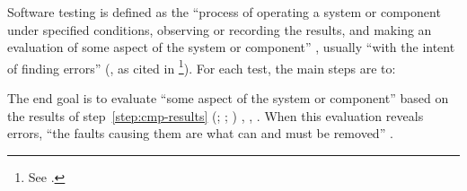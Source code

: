 Software testing is defined as the ``process of operating a system or component
under specified conditions, observing or recording the results, and making an
evaluation of some aspect of the system or component'' \citep{ISO_IEC2014}%
\ifnotpaper, usually ``with the intent of finding errors''
(\citealp{Myers1976}, as cited in \citealp[p.~438]{PetersAndPedrycz2000}%
\footnote{See .})\fi.
For each test, the main steps are to:
The end goal is to evaluate ``some aspect of the system or component'' based on
the results of step~\ref{step:cmp-results} \ifnotpaper (\citealp[p.~10]{IEEE2022};
    \citeyear[p.~6]{IEEE2021c}; \citealp{ISO_IEC2014})\else
    \cite[p.~10]{IEEE2022}, \cite[p.~6]{IEEE2021c}, \cite{ISO_IEC2014}\fi.
When this evaluation reveals errors, ``the faults causing them are what can and
must be removed'' \citep[p.~5\=/3]{SWEBOK2025}.

